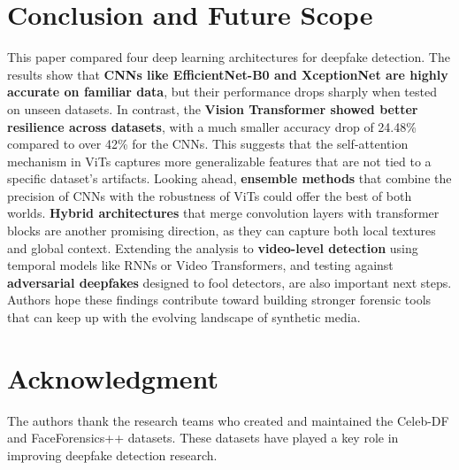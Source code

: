 \documentclass[runningheads]{llncs}
\begin{document}
\section{Conclusion and Future Scope}
This paper compared four deep learning architectures for deepfake detection. The results show that \textbf{CNNs like EfficientNet-B0 and XceptionNet are highly accurate on familiar data}, but their performance drops sharply when tested on unseen datasets. In contrast, the \textbf{Vision Transformer showed better resilience across datasets}, with a much smaller accuracy drop of 24.48\% compared to over 42\% for the CNNs. This suggests that the self-attention mechanism in ViTs captures more generalizable features that are not tied to a specific dataset's artifacts. Looking ahead, \textbf{ensemble methods} that combine the precision of CNNs with the robustness of ViTs could offer the best of both worlds. \textbf{Hybrid architectures} that merge convolution layers with transformer blocks are another promising direction, as they can capture both local textures and global context. Extending the analysis to \textbf{video-level detection} using temporal models like RNNs or Video Transformers, and testing against \textbf{adversarial deepfakes} designed to fool detectors, are also important next steps. Authors hope these findings contribute toward building stronger forensic tools that can keep up with the evolving landscape of synthetic media.

\section*{Acknowledgment}
The authors thank the research teams who created and maintained the Celeb-DF and FaceForensics++ datasets. These datasets have played a key role in improving deepfake detection research.
\end{document}
